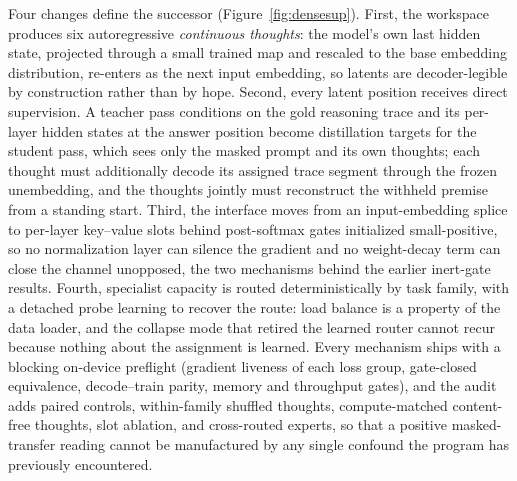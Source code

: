 \documentclass[10pt,a4paper]{article}
\begin{document}
Four changes define the successor (Figure~\ref{fig:densesup}). First, the
workspace produces six autoregressive \emph{continuous thoughts}: the
model's own last hidden state, projected through a small trained map and
rescaled to the base embedding distribution, re-enters as the next input
embedding, so latents are decoder-legible by construction rather than by
hope. Second, every latent position receives direct supervision. A teacher
pass conditions on the gold reasoning trace and its per-layer hidden states
at the answer position become distillation targets for the student pass,
which sees only the masked prompt and its own thoughts; each thought must
additionally decode its assigned trace segment through the frozen unembedding,
and the thoughts jointly must reconstruct the withheld premise from a
standing start. Third, the interface moves from an input-embedding splice to
per-layer key--value slots behind post-softmax gates initialized
small-positive, so no normalization layer can silence the gradient and no
weight-decay term can close the channel unopposed, the two mechanisms behind
the earlier inert-gate results. Fourth, specialist capacity is routed
deterministically by task family, with a detached probe learning to recover
the route: load balance is a property of the data loader, and the collapse
mode that retired the learned router cannot recur because nothing about the
assignment is learned. Every mechanism ships with a blocking on-device
preflight (gradient liveness of each loss group, gate-closed equivalence,
decode--train parity, memory and throughput gates), and the audit adds
paired controls, within-family shuffled thoughts, compute-matched
content-free thoughts, slot ablation, and cross-routed experts, so that a
positive masked-transfer reading cannot be manufactured by any single
confound the program has previously encountered.
\end{document}

